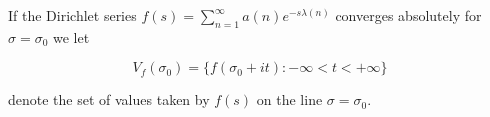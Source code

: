 If the Dirichlet series $f(s) = \sum_{n=1}^{\infty} a(n)e^{-s\lambda(n)}$ converges absolutely for $\sigma = \sigma_0$ we let

$$V_f(\sigma_0) = \{ f(\sigma_0 + it) : -\infty < t < +\infty \}$$

denote the set of values taken by $f(s)$ on the line $\sigma = \sigma_0$.
